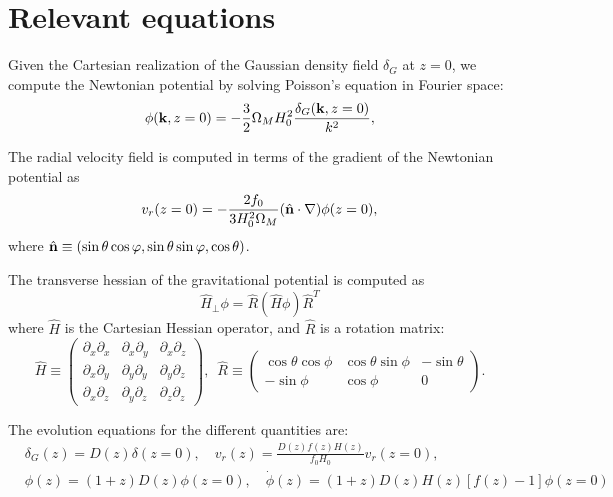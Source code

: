 \documentclass[a4paper,10pt]{article}
\newcommand{\nv}{\hat{\bf n}}
\begin{document}
\section{Relevant equations}
  Given the Cartesian realization of the Gaussian density field $\delta_G$ at $z=0$,
  we compute the Newtonian potential by solving Poisson's equation in Fourier space:
  \begin{equation}
    \phi({\bf k},z=0)=-\frac{3}{2}\Omega_MH_0^2\frac{\delta_G({\bf k},z=0)}{k^2},
  \end{equation}

  The radial velocity field is computed in terms of the gradient of the Newtonian
  potential as
  \begin{equation}
    v_r(z=0)=-\frac{2f_0}{3H_0^2\Omega_M}(\nv\cdot\nabla)\phi(z=0),
  \end{equation}
  where $\nv\equiv(\sin\theta\cos\varphi,\sin\theta\sin\varphi,\cos\theta)$.

  The transverse hessian of the gravitational potential is computed as
  \begin{equation}
    \hat{H}_\perp\phi=\hat{R}(\hat{H}\phi)\hat{R}^T
  \end{equation}
  where $\hat{H}$ is the Cartesian Hessian operator, and $\hat{R}$ is a rotation
  matrix:
  \begin{equation}
    \hat{H}\equiv\left(
    \begin{array}{ccc}
      \partial_x\partial_x & \partial_x\partial_y & \partial_x\partial_z\\
      \partial_x\partial_y & \partial_y\partial_y & \partial_y\partial_z\\
      \partial_x\partial_z & \partial_y\partial_z & \partial_z\partial_z
    \end{array}\right),
    \hspace{6pt}
    \hat{R}\equiv\left(
    \begin{array}{ccc}
      \cos\theta\cos\phi & \cos\theta\sin\phi & -\sin\theta\\
      -\sin\phi & \cos\phi & 0
    \end{array}
    \right).
  \end{equation}

  The evolution equations for the different quantities are:
  \begin{align}
    &\delta_G(z)=D(z)\delta(z=0),\hspace{12pt}
    v_r(z)=\frac{D(z)f(z)H(z)}{f_0H_0}v_r(z=0),\\
    &\phi(z)=(1+z)D(z)\phi(z=0),\hspace{12pt}
    \dot{\phi}(z)=(1+z)D(z)H(z)[f(z)-1]\phi(z=0)
  \end{align}
\end{document}
